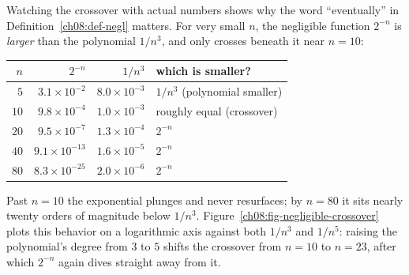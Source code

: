 Watching the crossover with actual numbers shows why the word ``eventually'' in Definition~\ref{ch08:def-negl} matters. For very small $n$, the negligible function $2^{-n}$ is \emph{larger} than the polynomial $1/n^{3}$, and only crosses beneath it near $n = 10$:

\begin{center}
\begin{tabular}{r r r l}
\toprule
$n$ & $2^{-n}$ & $1/n^{3}$ & which is smaller? \\
\midrule
$5$    & $3.1\times 10^{-2}$  & $8.0\times 10^{-3}$  & $1/n^3$ (polynomial smaller) \\
$10$   & $9.8\times 10^{-4}$  & $1.0\times 10^{-3}$  & roughly equal (crossover) \\
$20$   & $9.5\times 10^{-7}$  & $1.3\times 10^{-4}$  & $2^{-n}$ \\
$40$   & $9.1\times 10^{-13}$ & $1.6\times 10^{-5}$  & $2^{-n}$ \\
$80$   & $8.3\times 10^{-25}$ & $2.0\times 10^{-6}$  & $2^{-n}$ \\
\bottomrule
\end{tabular}
\end{center}

Past $n=10$ the exponential plunges and never resurfaces; by $n=80$ it sits nearly twenty orders of magnitude below $1/n^3$. Figure~\ref{ch08:fig-negligible-crossover} plots this behavior on a logarithmic axis against both $1/n^3$ and $1/n^5$: raising the polynomial's degree from $3$ to $5$ shifts the crossover from $n=10$ to $n=23$, after which $2^{-n}$ again dives straight away from it.

